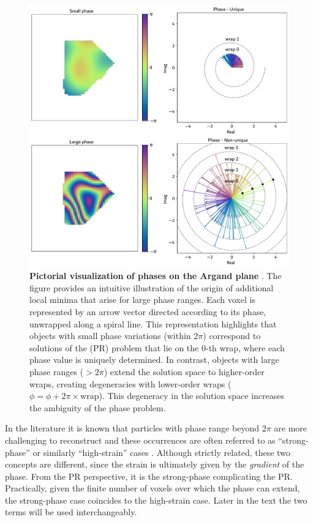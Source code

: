 \begin{figure}[H]
    \centering
    \includegraphics[width=.7\textwidth]{figures/Intro/spiral.pdf}
    \caption{\textbf{Pictorial visualization of phases on the Argand plane }. 
    The figure provides an intuitive illustration of the origin of additional local minima that arise for large phase ranges. 
Each voxel is represented by an arrow vector directed according to its phase, unwrapped along a spiral line. 
This representation highlights that objects with small phase variations (within $2\pi$) correspond to solutions of the 
 (PR) problem that lie on the $0$-th wrap, where each phase value is uniquely determined. 
In contrast, objects with large phase ranges ($> 2\pi$) extend the solution space to higher-order wraps, creating 
degeneracies with lower-order wraps ($\phi = \phi + 2\pi \times \text{wrap}$). 
This degeneracy in the solution space increases the ambiguity of the phase problem.
}
    \label{fig:argand}
\end{figure}

In the literature it is known that particles with phase range beyond $2\pi$ are more challenging to reconstruct and these 
occurrences are often referred to as ``strong-phase'' or similarly ``high-strain'' cases \cite{Cha_2010, NewtonStrain_2010, Pavlov2017}. 
Although strictly related, 
these two concepts are different, since the strain is ultimately given by the \textit{gradient} of the phase. From the 
PR perspective, it is the strong-phase complicating the PR. Practically, given the finite number of voxels over which 
the phase can extend, the strong-phase case coincides to the high-strain case. Later in the text the two terms will be 
used interchangeably. 

